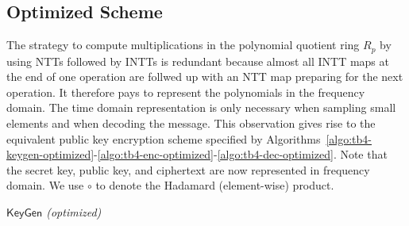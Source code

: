\subsection{Optimized Scheme}

The strategy to compute multiplications in the polynomial quotient ring $R_p$ by using NTTs followed by INTTs is redundant because almost all INTT maps at the end of one operation are follwed up with an NTT map preparing for the next operation. It therefore pays to represent the polynomials in the frequency domain. The time domain representation is only necessary when sampling small elements and when decoding the message. This observation gives rise to the equivalent public key encryption scheme specified by Algorithms~\ref{algo:tb4-keygen-optimized}-\ref{algo:tb4-enc-optimized}-\ref{algo:tb4-dec-optimized}. Note that the secret key, public key, and ciphertext are now represented in frequency domain. We use $\circ$ to denote the Hadamard (element-wise) product.

\begin{algorithm}[!t] \label{algo:tb4-keygen-optimized}
\begin{scriptsize}
\caption{\emph{$\mathsf{KeyGen}$ \textit{(optimized)}}}
\KwIn{}
\end{scriptsize}
\end{algorithm} 

